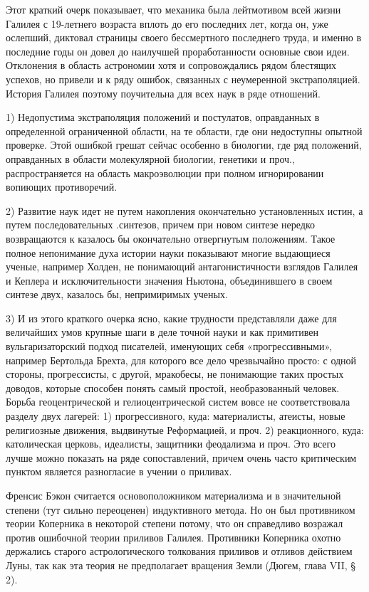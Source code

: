 Этот краткий очерк показывает, что механика была лейтмотивом всей жизни Галилея
с 19-летнего возраста вплоть до его последних лет, когда он, уже ослепший,
диктовал страницы своего бессмертного последнего труда, и именно в последние
годы он довел до наилучшей проработанности основные свои идеи. Отклонения в
область астрономии хотя и сопровождались рядом блестящих успехов, но привели и
к ряду ошибок, связанных с неумеренной экстраполяцией. История Галилея поэтому
поучительна для всех наук в ряде отношений.

1) Недопустима экстраполяция положений и постулатов, оправданных в определенной
ограниченной области, на те области, где они недоступны опытной проверке. Этой
ошибкой грешат сейчас особенно в биологии, где ряд положений, оправданных в
области молекулярной биологии, генетики и проч., распространяется на область
макроэволюции при полном игнорировании вопиющих противоречий.

2) Развитие наук идет не путем накопления окончательно установленных истин, а
путем последовательных .синтезов, причем при новом синтезе нередко возвращаются
к казалось бы окончательно отвергнутым положениям. Такое полное непонимание
духа истории науки показывают многие выдающиеся ученые, например Холден, не
понимающий антагонистичности взглядов Галилея и Кеплера и исключительности
значения Ньютона, объединившего в своем синтезе двух, казалось бы, непримиримых
ученых.

3) И из этого краткого очерка ясно, какие трудности представляли даже для
величайших умов крупные шаги в деле точной науки и как примитивен
вульгаризаторский подход писателей, именующих себя «прогрессивными», например
Бертольда Брехта, для которого все дело чрезвычайно просто: с одной стороны,
прогрессисты, с другой, мракобесы, не понимающие таких простых доводов, которые
способен понять самый простой, необразованный человек. Борьба геоцентрической и
гелиоцентрической систем вовсе не соответствовала разделу двух лагерей: 1)
прогрессивного, куда: материалисты, атеисты, новые религиозные движения,
выдвинутые Реформацией, и проч. 2) реакционного, куда: католическая церковь,
идеалисты, защитники феодализма и проч. Это всего лучше можно показать на ряде
сопоставлений, причем очень часто критическим пунктом является разногласие в
учении о приливах.

Френсис Бэкон считается основоположником материализма и в значительной степени
(тут сильно переоценен) индуктивного метода. Но он был противником теории
Коперника в некоторой степени потому, что он справедливо возражал против
ошибочной теории приливов Галилея. Противники Коперника охотно держались
старого астрологического толкования приливов и отливов действием Луны, так как
эта теория не предполагает вращения Земли (Дюгем, глава VII, § 2).

